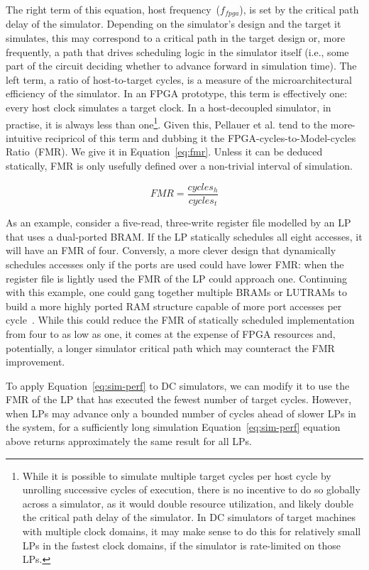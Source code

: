 The right term of this equation, host frequency~($f_{fpga}$), is set by the
critical path delay of the simulator. Depending on the simulator's design and
the target it simulates, this may correspond to a critical path in the target design or, more frequently, a path that
drives scheduling logic in the simulator itself (i.e., some part of the circuit deciding whether to
advance forward in simulation time). The left term, a ratio of host-to-target cycles, is a measure of the
microarchitectural efficiency of the simulator. In an FPGA prototype, this term is
effectively one: every host clock simulates a target clock. In
a host-decoupled simulator, in practise, it is always less than one\footnote{While it is possible to simulate multiple target cycles per
host cycle by unrolling successive cycles of execution, there is no incentive
to do so globally across a simulator, as it would double resource utilization,
and likely double the critical path delay of the simulator. In DC simulators
of target machines with multiple clock domains, it may make sense to do this
for relatively small LPs in the fastest clock domains, if the simulator is
rate-limited on those LPs.}. Given this, Pellauer et al. tend to the
more-intuitive recipricol of this term and dubbing it the FPGA-cycles-to-Model-cycles
Ratio~(FMR). We give it in Equation~\ref{eq:fmr}. Unless it can be deduced statically,
FMR is only usefully defined over a non-trivial interval of simulation.

\begin{equation}
    FMR = \frac{cycles_{h}}{cycles_{t}}
\end{equation}\label{eq:fmr}

As an example, consider a five-read, three-write register file modelled by an LP that
uses a dual-ported BRAM. If the LP statically schedules all eight accesses, it
will have an FMR of four. Conversly, a more clever design that dynamically
schedules accesses only if the ports are used could have lower FMR: when the register file is lightly used the FMR of the LP could
approach one. Continuing with
this example, one could gang together multiple BRAMs or LUTRAMs to build a more
highly ported RAM structure capable of more port accesses per cycle~\cite{MultiportLVT, MultiportXOR}.
While this could reduce the FMR of statically scheduled implementation from four to as low as one, it
comes at the expense of FPGA resources and, potentially, a longer simulator
critical path which may counteract the FMR improvement.

To apply Equation~\ref{eq:sim-perf} to DC simulators, we can modify it to use
the FMR of the LP that has executed the fewest number of target cycles.
However, when LPs may advance only a bounded number of cycles
ahead of slower LPs in the system, for a sufficiently long simulation Equation~\ref{eq:sim-perf}
equation above returns approximately the same result for all LPs.

